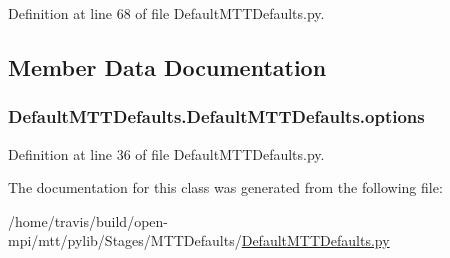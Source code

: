 Definition at line 68 of file Default\-M\-T\-T\-Defaults.\-py.



\subsection{Member Data Documentation}
\hypertarget{classDefaultMTTDefaults_1_1DefaultMTTDefaults_a733e1af4da36392ce6126d79c61aba0b}{
\subsubsection[{options}]{\setlength{\rightskip}{0pt plus 5cm}Default\-M\-T\-T\-Defaults.\-Default\-M\-T\-T\-Defaults.\-options}}\label{classDefaultMTTDefaults_1_1DefaultMTTDefaults_a733e1af4da36392ce6126d79c61aba0b}


Definition at line 36 of file Default\-M\-T\-T\-Defaults.\-py.



The documentation for this class was generated from the following file\-:\begin{DoxyCompactItemize}
\item 
/home/travis/build/open-\/mpi/mtt/pylib/\-Stages/\-M\-T\-T\-Defaults/\hyperlink{DefaultMTTDefaults_8py}{Default\-M\-T\-T\-Defaults.\-py}\end{DoxyCompactItemize}
